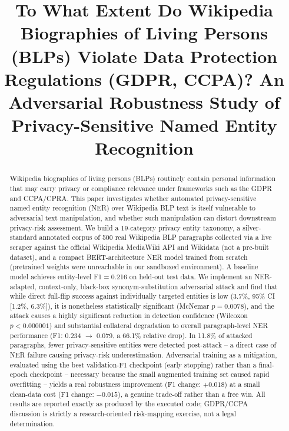 \documentclass[conference]{IEEEtran}
\begin{document}
\title{To What Extent Do Wikipedia Biographies of Living Persons (BLPs) Violate Data Protection Regulations (GDPR, CCPA)? An Adversarial Robustness Study of Privacy-Sensitive Named Entity Recognition}

\author{

\vspace{1em}

}

\maketitle

\begin{abstract}
Wikipedia biographies of living persons (BLPs) routinely contain personal information that may carry privacy or compliance relevance under frameworks such as the GDPR and CCPA/CPRA. This paper investigates whether automated privacy-sensitive named entity recognition (NER) over Wikipedia BLP text is itself vulnerable to adversarial text manipulation, and whether such manipulation can distort downstream privacy-risk assessment. We build a 19-category privacy entity taxonomy, a silver-standard annotated corpus of 500 real Wikipedia BLP paragraphs collected via a live scraper against the official Wikipedia MediaWiki API and Wikidata (not a pre-built dataset), and a compact BERT-architecture NER model trained from scratch (pretrained weights were unreachable in our sandboxed environment). A baseline model achieves entity-level F1$=$0.216 on held-out test data. We implement an NER-adapted, context-only, black-box synonym-substitution adversarial attack and find that while direct full-flip success against individually targeted entities is low (3.7\%, 95\% CI [1.2\%, 6.3\%]), it is nonetheless statistically significant (McNemar $p=0.0078$), and the attack causes a highly significant reduction in detection confidence (Wilcoxon $p<0.000001$) and substantial collateral degradation to overall paragraph-level NER performance (F1: 0.234 $\to$ 0.079, a 66.1\% relative drop). In 11.8\% of attacked paragraphs, fewer privacy-sensitive entities were detected post-attack -- a direct case of NER failure causing privacy-risk underestimation. Adversarial training as a mitigation, evaluated using the best validation-F1 checkpoint (early stopping) rather than a final-epoch checkpoint -- necessary because the small augmented training set caused rapid overfitting -- yields a real robustness improvement (F1 change: $+0.018$) at a small clean-data cost (F1 change: $-0.015$), a genuine trade-off rather than a free win. All results are reported exactly as produced by the executed code; GDPR/CCPA discussion is strictly a research-oriented risk-mapping exercise, not a legal determination.
\end{abstract}
\end{document}
